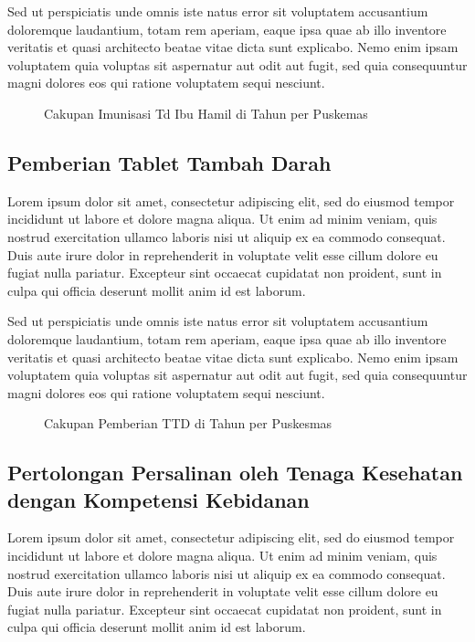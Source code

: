Sed ut perspiciatis unde omnis iste natus error sit voluptatem accusantium doloremque laudantium, totam rem aperiam, eaque ipsa quae ab illo inventore veritatis et quasi architecto beatae vitae dicta sunt explicabo. Nemo enim ipsam voluptatem quia voluptas sit aspernatur aut odit aut fugit, sed quia consequuntur magni dolores eos qui ratione voluptatem sequi nesciunt.

\begin{figure}[H]
    \centering{}
    \caption{Cakupan Imunisasi Td Ibu Hamil di \namaKabupaten Tahun \tP per
Puskemas}
    \label{fig:Cakupan-Td}
\end{figure}


\subsection{Pemberian Tablet Tambah Darah}
Lorem ipsum dolor sit amet, consectetur adipiscing elit, sed do eiusmod tempor incididunt ut labore et dolore magna aliqua. Ut enim ad minim veniam, quis nostrud exercitation ullamco laboris nisi ut aliquip ex ea commodo consequat. Duis aute irure dolor in reprehenderit in voluptate velit esse cillum dolore eu fugiat nulla pariatur. Excepteur sint occaecat cupidatat non proident, sunt in culpa qui officia deserunt mollit anim id est laborum.

Sed ut perspiciatis unde omnis iste natus error sit voluptatem accusantium doloremque laudantium, totam rem aperiam, eaque ipsa quae ab illo inventore veritatis et quasi architecto beatae vitae dicta sunt explicabo. Nemo enim ipsam voluptatem quia voluptas sit aspernatur aut odit aut fugit, sed quia consequuntur magni dolores eos qui ratione voluptatem sequi nesciunt.

\begin{figure}[H]
    \centering
    \caption{Cakupan Pemberian TTD di \namaKabupaten Tahun \tP per Puskesmas}
    \label{fig:Cakupan-TTD}
\end{figure}

\subsection{Pertolongan Persalinan oleh Tenaga Kesehatan dengan Kompetensi Kebidanan}
Lorem ipsum dolor sit amet, consectetur adipiscing elit, sed do eiusmod tempor incididunt ut labore et dolore magna aliqua. Ut enim ad minim veniam, quis nostrud exercitation ullamco laboris nisi ut aliquip ex ea commodo consequat. Duis aute irure dolor in reprehenderit in voluptate velit esse cillum dolore eu fugiat nulla pariatur. Excepteur sint occaecat cupidatat non proident, sunt in culpa qui officia deserunt mollit anim id est laborum.

